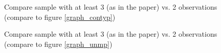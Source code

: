 \begin{figure}
    \caption{Compare sample with at least 3 (as in the paper) vs. 2 observations (compare to figure \ref{graph_contyp})}
    \label{graph_sensitivity_compare_contyp_sample_2_years}
\end{figure}

\begin{figure}
    \caption{Compare sample with at least 3 (as in the paper) vs. 2 observations (compare to figure \ref{graph_unmp})}
    \label{graph_sensitivity_compare_unmp_sample_2_years}
\end{figure}

